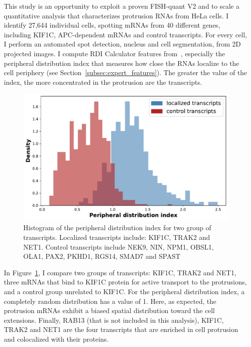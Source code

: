 This study is an opportunity to exploit a proven FISH-quant V2 and to scale a quantitative analysis that characterizes protrusion \ac{RNA}s from HeLa cells.
I identify 27,644 individual cells, spotting \ac{mRNA}s from 40 different genes, including KIF1C, APC-dependent \ac{mRNA}s and control transcripts.
For every cell, I perform an automated spot detection, nucleus and cell segmentation, from 2D projected images.
I compute RDI Calculator features from~\cite{stueland_rdi_2019}, especially the peripheral distribution index that measures how close the \ac{RNA}s localize to the cell periphery (see Section~\ref{subsec:expert_features}).
The greater the value of the index, the more concentrated in the protrusion are the transcripts.

\begin{figure}[]
    \centering
    \includegraphics[width=\textwidth]{figures/chapter5/helacentrin_distribution_pdi}
    \caption[Histogram of the peripheral distribution index]{Histogram of the peripheral distribution index for two group of transcripts.
	Localized transcripts include: KIF1C, TRAK2 and NET1.
	Control transcripts include NEK9, NIN, NPM1, OBSL1, OLA1, PAX2, PKHD1, RGS14, SMAD7 and SPAST}
    \label{fig:xavier_pdi}
\end{figure}

In Figure~\ref{fig:xavier_pdi}, I compare two groups of transcripts: KIF1C, TRAK2 and NET1, three \ac{mRNA}s that bind to KIF1C protein for active transport to the protrusions, and a control group unrelated to KIF1C.
For the peripheral distribution index, a completely random distribution has a value of 1.
Here, as expected, the protrusion \ac{mRNA}s exhibit a biased spatial distribution toward the cell extensions.
Finally, RAB13 (that is not included in this analysis), KIF1C, TRAK2 and NET1 are the four transcripts that are enriched in cell protrusion and colocalized with their proteins.

